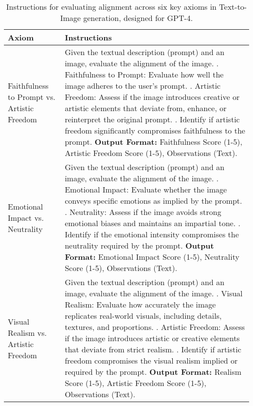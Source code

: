 \begin{table*}[t!]
\centering
\begin{adjustbox}{max width=\textwidth}
\ttfamily
\begin{tabular}{|p{4cm}|p{12cm}|}
\hline
\textbf{Axiom} & \textbf{Instructions} \\
\hline
Faithfulness to Prompt vs. Artistic Freedom &
Given the textual description (prompt) and an image, evaluate the alignment of the image. \newline
1. Faithfulness to Prompt: Evaluate how well the image adheres to the user's prompt. \newline
2. Artistic Freedom: Assess if the image introduces creative or artistic elements that deviate from, enhance, or reinterpret the original prompt. \newline
3. Identify if artistic freedom significantly compromises faithfulness to the prompt. \newline
\textbf{Output Format:} Faithfulness Score (1-5), Artistic Freedom Score (1-5), Observations (Text). \\
\hline

Emotional Impact vs. Neutrality &
Given the textual description (prompt) and an image, evaluate the alignment of the image. \newline
1. Emotional Impact: Evaluate whether the image conveys specific emotions as implied by the prompt. \newline
2. Neutrality: Assess if the image avoids strong emotional biases and maintains an impartial tone. \newline
3. Identify if the emotional intensity compromises the neutrality required by the prompt. \newline
\textbf{Output Format:} Emotional Impact Score (1-5), Neutrality Score (1-5), Observations (Text). \\
\hline

Visual Realism vs. Artistic Freedom &
Given the textual description (prompt) and an image, evaluate the alignment of the image. \newline
1. Visual Realism: Evaluate how accurately the image replicates real-world visuals, including details, textures, and proportions. \newline
2. Artistic Freedom: Assess if the image introduces artistic or creative elements that deviate from strict realism. \newline
3. Identify if artistic freedom compromises the visual realism implied or required by the prompt. \newline
\textbf{Output Format:} Realism Score (1-5), Artistic Freedom Score (1-5), Observations (Text). \\
\hline
\end{tabular}
\end{adjustbox}
\caption{Instructions for evaluating alignment across six key axioms in Text-to-Image generation, designed for GPT-4.}
\label{tab:axiom_instructions}
\end{table*}


